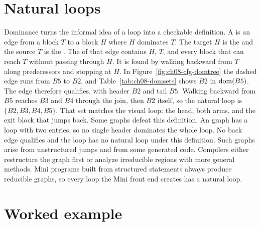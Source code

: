 \section{Natural loops}
\label{sec:ch08-natural-loops}

Dominance turns the informal idea of a loop into a checkable definition.
A  is an edge from a block $T$ to a block $H$ where $H$ dominates $T$.
The target $H$ is the  and the source $T$ is the .
The  of that edge contains $H$, $T$, and every block that can reach $T$ without passing through $H$.
It is found by walking backward from $T$ along predecessors and stopping at $H$.
In Figure~\ref{fig:ch08-cfg-domtree} the dashed edge runs from $B5$ to $B2$, and Table~\ref{tab:ch08-domsets} shows $B2$ in $\operatorname{dom}(B5)$.
The edge therefore qualifies, with header $B2$ and tail $B5$.
Walking backward from $B5$ reaches $B3$ and $B4$ through the join, then $B2$ itself, so the natural loop is $\{B2, B3, B4, B5\}$.
That set matches the visual loop: the head, both arms, and the exit block that jumps back.
Some graphs defeat this definition.
An  graph has a loop with two entries, so no single header dominates the whole loop.
No back edge qualifies and the loop has no natural loop under this definition.
Such graphs arise from unstructured jumps and from some generated code.
Compilers either restructure the graph first or analyze irreducible regions with more general methods.
Mini programs built from structured statements always produce reducible graphs, so every loop the Mini front end creates has a natural loop.

\section{Worked example}
\label{sec:ch08-worked-example}


